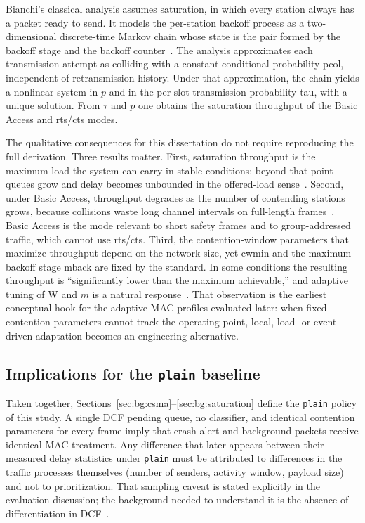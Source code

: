 Bianchi's classical analysis assumes saturation, in which every station always has a packet ready to send.
It models the per-station backoff process as a two-dimensional discrete-time Markov chain whose state is the pair formed by the backoff stage and the backoff counter~\cite{bianchi2000DCF}.
The analysis approximates each transmission attempt as colliding with a constant conditional probability \gls{pcol}, independent of retransmission history.
Under that approximation, the chain yields a nonlinear system in $p$ and in the per-slot transmission probability \gls{tau}, with a unique solution.
From $\tau$ and $p$ one obtains the saturation throughput of the Basic Access and \gls{rts}/\gls{cts} modes.

The qualitative consequences for this dissertation do not require reproducing the full derivation.
Three results matter.
First, saturation throughput is the maximum load the system can carry in stable conditions; beyond that point queues grow and delay becomes unbounded in the offered-load sense~\cite{bianchi2000DCF}.
Second, under Basic Access, throughput degrades as the number of contending stations grows, because collisions waste long channel intervals on full-length frames~\cite{bianchi2000DCF}.
Basic Access is the mode relevant to short safety frames and to group-addressed traffic, which cannot use \gls{rts}/\gls{cts}.
Third, the contention-window parameters that maximize throughput depend on the network size, yet \gls{cwmin} and the maximum backoff stage \gls{mback} are fixed by the standard.
In some conditions the resulting throughput is ``significantly lower than the maximum achievable,'' and adaptive tuning of \gls{W} and $m$ is a natural response~\cite{bianchi2000DCF}.
That observation is the earliest conceptual hook for the adaptive MAC profiles evaluated later: when fixed contention parameters cannot track the operating point, local, load- or event-driven adaptation becomes an engineering alternative.

\subsection{Implications for the \texttt{plain} baseline}
\label{sec:bg:plain}

Taken together, Sections~\ref{sec:bg:csma}--\ref{sec:bg:saturation} define the \texttt{plain} policy of this study.
A single DCF pending queue, no classifier, and identical contention parameters for every frame imply that crash-alert and background packets receive identical MAC treatment.
Any difference that later appears between their measured delay statistics under \texttt{plain} must be attributed to differences in the traffic processes themselves (number of senders, activity window, payload size) and not to prioritization.
That sampling caveat is stated explicitly in the evaluation discussion; the background needed to understand it is the absence of differentiation in DCF~\cite{mangold2003QoS,RFC8325_WiFi_QoS}.

